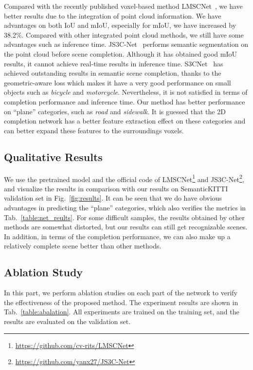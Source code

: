 \documentclass[letterpaper, 10 pt, conference]{ieeeconf}
\begin{document}
Compared with the recently published voxel-based method LMSCNet~\cite{roldao2020lmscnet}, we have better results due to the integration of point cloud information. We have advantages on both IoU and mIoU, especially for mIoU, we have increased by 38.2\%. Compared with other integrated point cloud methods, we still have some advantages such as inference time. JS3C-Net~\cite{yan2020sparse} performs semantic segmentation on the point cloud before scene completion. Although it has obtained good mIoU results, it cannot achieve real-time results in inference time. S3CNet~\cite{cheng2020s3cnet} has achieved outstanding results in semantic scene completion, thanks to the geometric-aware loss which makes it have a very good performance on small objects such as \textit{bicycle} and \textit{motorcycle}. Nevertheless, it is not satisfied in terms of completion performance and inference time. Our method has better performance on ``plane'' categories, such as \textit{road} and \textit{sidewalk}. It is guessed that the 2D completion network has a better feature extraction effect on these categories and can better expand these features to the surroundings voxels.

\subsection{Qualitative Results}

We use the pretrained model and the official code of LMSCNet\footnote{\url{https://github.com/cv-rits/LMSCNet}} and JS3C-Net\footnote{\url{https://github.com/yanx27/JS3C-Net}}, and visualize the results in comparison with our results on SemanticKITTI validation set in Fig.~\ref{fig:results}. It can be seen that we do have obvious advantages in predicting the ``plane'' categories, which also verifies the metrics in Tab.~\ref{table:net_reults}. For some difficult samples, the results obtained by other methods are somewhat distorted, but our results can still get recognizable scenes. In addition, in terms of the completion performance, we can also make up a relatively complete scene better than other methods.


\subsection{Ablation Study}

In this part, we perform ablation studies on each part of the network to verify the effectiveness of the proposed method. The experiment results are shown in Tab.~\ref{table:abalation}. All experiments are trained on the training set, and the results are evaluated on the validation set.
\end{document}
